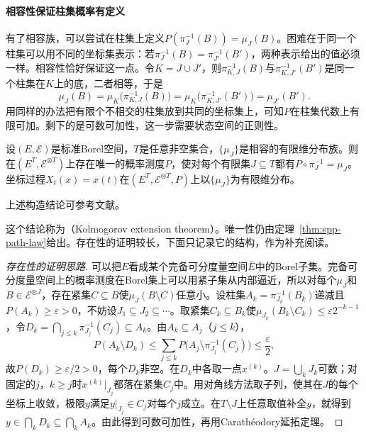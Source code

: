 \paragraph{相容性保证柱集概率有定义}
有了相容族，可以尝试在柱集上定义$P(\pi_J^{-1}(B))=\mu_J(B)$。困难在于同一个柱集可以用不同的坐标集表示：若$\pi_J^{-1}(B)=\pi_{J'}^{-1}(B')$，两种表示给出的值必须一样。相容性恰好保证这一点。令$K=J\cup J'$，则$\pi_{K,J}^{-1}(B)$与$\pi_{K,J'}^{-1}(B')$是同一个柱集在$K$上的底，二者相等，于是
\[
  \mu_J(B)=\mu_K\bigl(\pi_{K,J}^{-1}(B)\bigr)=\mu_K\bigl(\pi_{K,J'}^{-1}(B')\bigr)=\mu_{J'}(B').
\]
用同样的办法把有限个不相交的柱集放到共同的坐标集上，可知$P$在柱集代数上有限可加。剩下的是可数可加性，这一步需要状态空间的正则性。

\begin{theorem}[Kolmogorov扩张定理]
\label{thm:spp-kolmogorov-extension}
设$(E,\mathcal E)$是标准Borel空间，$T$是任意非空集合，$\{\mu_J\}$是相容的有限维分布族。则在$(E^T,\mathcal E^{\otimes T})$上存在唯一的概率测度$P$，使对每个有限集$J\subseteq T$都有$P\circ\pi_J^{-1}=\mu_J$。坐标过程$X_t(x)=x(t)$在$(E^T,\mathcal E^{\otimes T},P)$上以$\{\mu_J\}$为有限维分布。
\end{theorem}

上述构造结论可参考文献。

这个结论称为（Kolmogorov extension theorem）。唯一性仍由定理~\ref{thm:spp-path-law}给出。存在性的证明较长，下面只记录它的结构，作为补充阅读。

\begin{proof}[存在性的证明思路]
可以把$E$看成某个完备可分度量空间$\bar E$中的Borel子集。完备可分度量空间上的概率测度在Borel集上可以用紧子集从内部逼近，所以对每个$\mu_J$和$B\in\mathcal E^{\otimes J}$，存在紧集$C\subseteq B$使$\mu_J(B\setminus C)$任意小。设柱集$A_k=\pi_{J_k}^{-1}(B_k)$递减且$P(A_k)\ge\varepsilon>0$，不妨设$J_1\subseteq J_2\subseteq\cdots$。取紧集$C_k\subseteq B_k$使$\mu_{J_k}(B_k\setminus C_k)\le\varepsilon2^{-k-1}$，令$D_k=\bigcap_{j\le k}\pi_{J_j}^{-1}(C_j)\subseteq A_k$。由$A_k\subseteq A_j$（$j\le k$），
\[
  P(A_k\setminus D_k)\le\sum_{j\le k}P\bigl(A_j\setminus\pi_{J_j}^{-1}(C_j)\bigr)\le\frac\varepsilon2 ,
\]
故$P(D_k)\ge\varepsilon/2>0$，每个$D_k$非空。在$D_k$中各取一点$x^{(k)}$。$J=\bigcup_kJ_k$可数；对固定的$j$，$k\ge j$时$x^{(k)}|_{J_j}$都落在紧集$C_j$中。用对角线方法取子列，使其在$J$的每个坐标上收敛，极限$y$满足$y|_{J_j}\in C_j$对每个$j$成立。在$T\setminus J$上任意取值补全$y$，就得到$y\in\bigcap_kD_k\subseteq\bigcap_kA_k$。由此得到可数可加性，再用Carathéodory延拓定理。
\end{proof}

